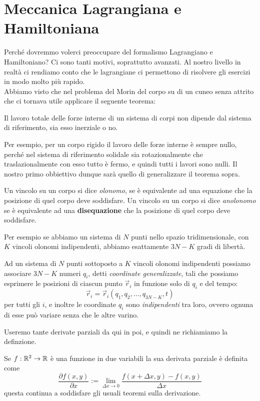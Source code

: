 \documentclass[11pt]{scrartcl}
\newcommand{\posit}{\vec{r}}
\begin{document}
	
	\newpage
	
	\section{Meccanica Lagrangiana e Hamiltoniana}
	Perché dovremmo volerci preoccupare del formalismo Lagrangiano e Hamiltoniano? Ci sono tanti motivi, soprattutto avanzati. Al nostro livello in realtà ci rendiamo conto che le lagrangiane ci permettono di risolvere gli esercizi in modo molto più rapido.\\
	Abbiamo visto che nel problema del Morin del corpo su di un cuneo senza attrito che ci tornava utile applicare il seguente teorema:
	\begin{theorem}
		Il lavoro totale delle forze interne di un sistema di corpi non dipende dal sistema di riferimento, sia esso inerziale o no.
	\end{theorem}
	Per esempio, per un corpo rigido il lavoro delle forze interne è sempre nullo, perché nel sistema di riferimento solidale sia rotazionalmente che traslazionalmente con esso tutto è fermo, e quindi tutti i lavori sono nulli. Il nostro primo obbiettivo dunque sarà quello di generalizzare il teorema sopra. 
	\begin{definition}
		Un vincolo su un corpo si dice \textit{olonomo}, se è equivalente ad una equazione che la posizione di quel corpo deve soddisfare. Un vincolo su un corpo si dice \textit{anolonomo} se è equivalente ad una \textbf{disequazione} che la posizione di quel corpo deve soddisfare.
	\end{definition}
	Per esempio se abbiamo un sistema di $N$ punti nello spazio tridimensionale, con $K$ vincoli olonomi indipendenti, abbiamo esattamente $3N-K$ gradi di libertà.
	\begin{definition}
		Ad un sistema di $N$ punti sottoposto a $K$ vincoli olonomi indipendenti possiamo associare $3N-K$ numeri $q_i$, detti \textit{coordinate generalizzate}, tali che possiamo esprimere le posizioni di ciascun punto $\posit_i$ in funzione solo di $q_i$ e del tempo:
		$$\posit_i=\posit_i\left(q_1,q_2,\dots,q_{3N-K},t\right)$$
		per tutti gli $i$, e inoltre le coordinate $q_i$ sono \textit{indipendenti} tra loro, ovvero ognuna di esse può variare senza che le altre varino.
	\end{definition}
	Useremo tante derivate parziali da qui in poi, e quindi ne richiamiamo la definzione.
	\begin{definition}
		 Se $f:\mathbb R^2\to\mathbb R$ è una funzione in due variabili la sua derivata parziale è definita come
		$$\frac{\partial f(x,y)}{\partial x}:=\lim_{\Delta x \to 0}\frac{f(x+\Delta x, y)-f(x,y)}{\Delta x}$$
		questa continua a soddisfare gli usuali teoremi sulla derivazione.
	\end{definition}
\end{document}
